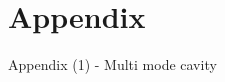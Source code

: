 \documentclass{beamer}
\begin{document}
\section{Appendix}
\begin{frame}[t,fragile]{Appendix (1) - Multi mode cavity}
\begin{figure}
  \centering
  \quad
  \\
\end{figure}
\end{frame}
\end{document}
